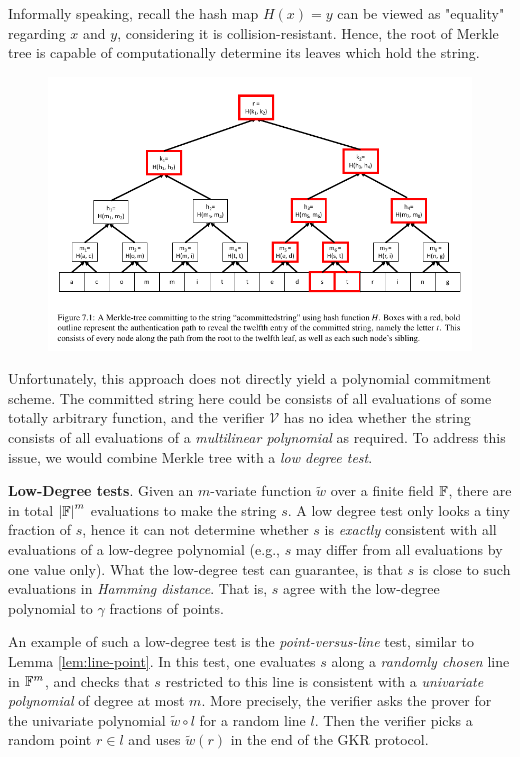 \documentclass{article}
\begin{document}
Informally speaking, recall the hash map $H(x) = y$ can be viewed as "equality" regarding $x$ and $y$, considering it is collision-resistant. Hence, the root of Merkle tree is capable of computationally determine its leaves which hold the string. 

\begin{figure}[h]
\centering
\includegraphics[scale=0.6]{merkle_tree}
\end{figure}

Unfortunately, this approach does not directly yield a polynomial commitment scheme. The committed string here could be consists of all evaluations of some totally arbitrary function, and the verifier $\mathcal{V}$ has no idea whether the string consists of all evaluations of a \textit{multilinear polynomial} as required. To address this issue, we would combine Merkle tree with a \textit{low degree test}. 

\textbf{Low-Degree tests}. Given an $m$-variate function $\widetilde{w}$ over a finite field $\mathbb{F}$, there are in total $\abs{\mathbb{F}}^m$ evaluations to make the string $s$. A low degree test only looks a tiny fraction of $s$, hence it can not determine whether $s$ is \textit{exactly} consistent with all evaluations of a low-degree polynomial (e.g., $s$ may differ from all evaluations by one value only). What the low-degree test can guarantee, is that $s$ is close to such evaluations in \textit{Hamming distance}. That is, $s$ agree with the low-degree polynomial to $\gamma$ fractions of points. 

An example of such a low-degree test is the \textit{point-versus-line} test, similar to Lemma \ref{lem:line-point}. In this test, one evaluates $s$ along a \textit{randomly chosen} line in $\mathbb{F}^m$, and checks that $s$ restricted to this line is consistent with a \textit{univariate polynomial} of degree at most $m$. More precisely, the verifier asks the prover for the univariate polynomial $\widetilde{w} \circ l$ for a random line $l$. Then the verifier picks a random point $r \in l$ and uses $\widetilde{w}(r)$ in the end of the GKR protocol. 
\end{document}
